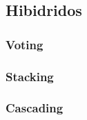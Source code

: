 \documentclass[titlepage,a4paper]{article}
\begin{document}
\subsection{Hibidridos}
\subsubsection{Voting}
\subsubsection{Stacking}
\subsubsection{Cascading}
\end{document}
